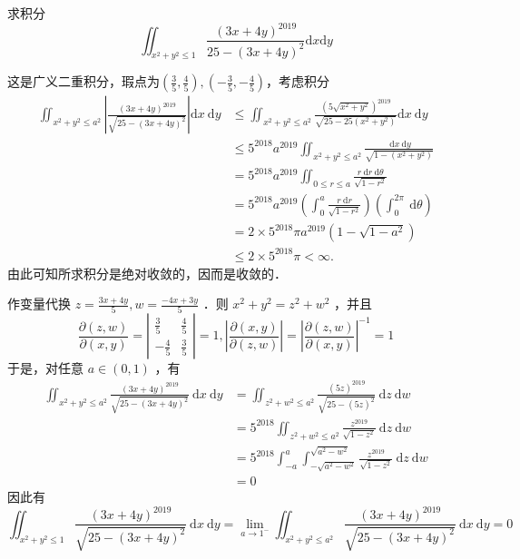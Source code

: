 \begin{exercise}
    求积分
    \[
        \iint_{x^2+y^2\leq 1}\frac{(3x+4y)^{2019}}{25-(3x+4y)^2}\mathrm{d}x\mathrm{d}y
    \]
\end{exercise}
\begin{solution}
    这是广义二重积分，瑕点为$(\frac{3}{5},\frac{4}{5}),(-\frac{3}{5},-\frac{4}{5})$，考虑积分
    $$
\begin{aligned}
\iint_{x^2+y^2 \leq a^2}\left|\frac{(3 x+4 y)^{2019}}{\sqrt{25-(3 x+4 y)^2}}\right| \mathrm{d} x \mathrm{~d} y & \leq \iint_{x^2+y^2 \leq a^2} \frac{\left(5 \sqrt{x^2+y^2}\right)^{2019}}{\sqrt{25-25\left(x^2+y^2\right)}} \mathrm{d} x \mathrm{~d} y \\
& \leq 5^{2018} a^{2019} \iint_{x^2+y^2 \leq a^2} \frac{\mathrm{~d} x \mathrm{~d} y}{\sqrt{1-\left(x^2+y^2\right)}} \\
& =5^{2018} a^{2019} \iint_{0 \leq r \leq a} \frac{r \mathrm{~d} r \mathrm{~d} \theta}{\sqrt{1-r^2}} \\
& =5^{2018} a^{2019}\left(\int_0^a \frac{r \mathrm{~d} r}{\sqrt{1-r^2}}\right)\left(\int_0^{2 \pi} \mathrm{~d} \theta\right) \\
& =2 \times 5^{2018} \pi a^{2019}\left(1-\sqrt{1-a^2}\right) \\
& \leq 2 \times 5^{2018} \pi<\infty .
\end{aligned}
$$
由此可知所求积分是绝对收敛的，因而是收敛的．

作变量代换 $z=\frac{3 x+4 y}{5}, w=\frac{-4 x+3 y}{5}$ ．则 $x^2+y^2=z^2+w^2$ ，并且
$$
\frac{\partial(z, w)}{\partial(x, y)}=\left|\begin{array}{cc}
\frac{3}{5} & \frac{4}{5} \\
-\frac{4}{5} & \frac{3}{5}
\end{array}\right|=1,\left|\frac{\partial(x, y)}{\partial(z, w)}\right|=\left|\frac{\partial(z, w)}{\partial(x, y)}\right|^{-1}=1
$$
于是，对任意 $a \in(0,1)$ ，有
$$
\begin{aligned}
\iint_{x^2+y^2 \leq a^2} \frac{(3 x+4 y)^{2019}}{\sqrt{25-(3 x+4 y)^2}} \mathrm{~d} x \mathrm{~d} y & =\iint_{z^2+w^2 \leq a^2} \frac{(5 z)^{2019}}{\sqrt{25-(5 z)^2}} \mathrm{~d} z \mathrm{~d} w \\
& =5^{2018} \iint_{z^2+w^2 \leq a^2} \frac{z^{2019}}{\sqrt{1-z^2}} \mathrm{~d} z \mathrm{~d} w \\
& =5^{2018} \int_{-a}^a \int_{-\sqrt{a^2-w^2}}^{\sqrt{a^2-w^2}} \frac{z^{2019}}{\sqrt{1-z^2}} \mathrm{~d} z \mathrm{~d} w \\
& =0
\end{aligned}
$$
因此有
$$
\iint_{x^2+y^2 \leq 1} \frac{(3 x+4 y)^{2019}}{\sqrt{25-(3 x+4 y)^2}} \mathrm{~d} x \mathrm{~d} y=\lim _{a \rightarrow 1^{-}} \iint_{x^2+y^2 \leq a^2} \frac{(3 x+4 y)^{2019}}{\sqrt{25-(3 x+4 y)^2}} \mathrm{~d} x \mathrm{~d} y=0
$$
\end{solution}





